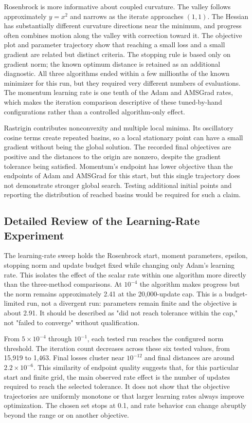 ﻿\documentclass[conference]{IEEEtran}
\begin{document}
Rosenbrock is more informative about coupled curvature. The valley follows approximately $y=x^2$ and narrows as the iterate approaches $(1,1)$. The Hessian has substantially different curvature directions near the minimum, and progress often combines motion along the valley with correction toward it. The objective plot and parameter trajectory show that reaching a small loss and a small gradient are related but distinct criteria. The stopping rule is based only on gradient norm; the known optimum distance is retained as an additional diagnostic. All three algorithms ended within a few millionths of the known minimizer for this run, but they required very different numbers of evaluations. The momentum learning rate is one tenth of the Adam and AMSGrad rates, which makes the iteration comparison descriptive of these tuned-by-hand configurations rather than a controlled algorithm-only effect.

Rastrigin contributes nonconvexity and multiple local minima. Its oscillatory cosine terms create repeated basins, so a local stationary point can have a small gradient without being the global solution. The recorded final objectives are positive and the distances to the origin are nonzero, despite the gradient tolerance being satisfied. Momentum's endpoint has lower objective than the endpoints of Adam and AMSGrad for this start, but this single trajectory does not demonstrate stronger global search. Testing additional initial points and reporting the distribution of reached basins would be required for such a claim.
\subsection{Detailed Review of the Learning-Rate Experiment}
The learning-rate sweep holds the Rosenbrock start, moment parameters, epsilon, stopping norm and update budget fixed while changing only Adam's learning rate. This isolates the effect of the scalar rate within one algorithm more directly than the three-method comparisons. At $10^{-4}$ the algorithm makes progress but the norm remains approximately 2.41 at the 20,000-update cap. This is a budget-limited run, not a divergent run: parameters remain finite and the objective is about 2.91. It should be described as "did not reach tolerance within the cap," not "failed to converge" without qualification.

From $5\times10^{-4}$ through $10^{-1}$, each tested run reaches the configured norm threshold. The iteration count decreases across these six tested values, from 15,919 to 1,463. Final losses cluster near $10^{-12}$ and final distances are around $2.2\times10^{-6}$. This similarity of endpoint quality suggests that, for this particular start and finite grid, the main observed rate effect is the number of updates required to reach the selected tolerance. It does not show that the objective trajectories are uniformly monotone or that larger learning rates always improve optimization. The chosen set stops at 0.1, and rate behavior can change abruptly beyond the range or on another objective.
\end{document}

